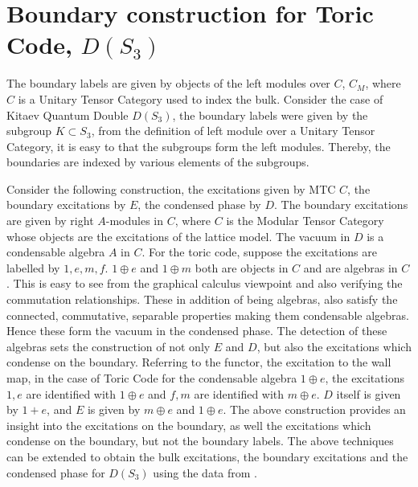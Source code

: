 \section{Boundary construction for Toric Code, $D(S_{3})$}
      The boundary labels are given by objects of the left modules over $C$, $C_{M}$, where $C$ is a Unitary Tensor Category used to index the bulk. Consider the case of Kitaev Quantum 
Double $D(S_{3})$, the boundary labels were given by the subgroup $K \subset S_{3}$, from the definition of left module over a Unitary Tensor Category, it is easy to that the subgroups form the left modules. 
Thereby, the boundaries are indexed by various elements of the subgroups. 

      Consider the following construction, the excitations given by MTC $C$, the boundary excitations by $E$, the condensed phase by $D$. The boundary excitations are given by right $A$-modules in $C$, 
where $C$ is the Modular Tensor Category whose objects are the excitations of the lattice model. The vacuum in $D$ is a condensable algebra $A$ in $C$. For the toric code, suppose the excitations are labelled by 
$1, e, m, f$. $1 \oplus e$ and $1 \oplus m$ both are objects in $C$ and are algebras in $C$. This is easy to see from the graphical calculus viewpoint and also verifying the commutation relationships.
These in addition of being algebras, also satisfy the connected, commutative, separable properties making them condensable algebras. Hence these form the vacuum in the condensed phase. The detection of these
algebras sets the construction of not only $E$ and $D$, but also the excitations which condense on the boundary. Referring to the functor, the excitation to the wall map, in the case of Toric Code for the condensable
algebra $1 \oplus e$, the excitations $1, e$ are identified with $1 \oplus e$ and $f, m$ are identified with $ m \oplus e$.  $D$ itself is given by $1+e$, and $E$ is given by $m \oplus e$ and  $1 \oplus e$. 
The above construction provides an insight into the  excitations on the boundary, as well the excitations which condense on the boundary, but not the boundary labels. The above techniques can be extended to obtain the 
bulk excitations, the boundary excitations and the condensed phase for $D(S_{3})$ using the data from \citep{Reference7}.

